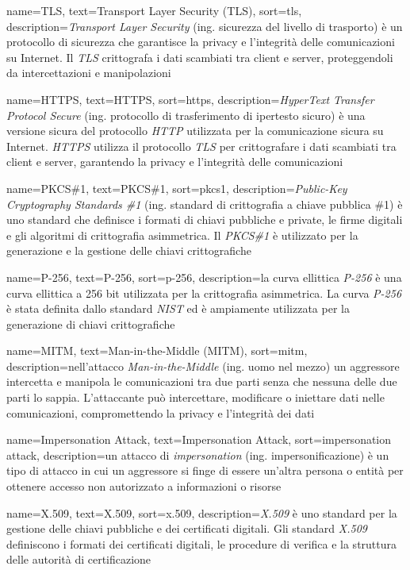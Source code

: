  {
    name=TLS,
    text=Transport Layer Security (TLS),
    sort=tls,
    description={\emph{Transport Layer Security} (ing. sicurezza del livello di trasporto) è un protocollo di sicurezza che garantisce la privacy e l'integrità delle comunicazioni su Internet. Il \emph{TLS} crittografa i dati scambiati tra client e server, proteggendoli da intercettazioni e manipolazioni}
}

 {
    name=HTTPS,
    text=HTTPS,
    sort=https,
    description={\emph{HyperText Transfer Protocol Secure} (ing. protocollo di trasferimento di ipertesto sicuro) è una versione sicura del protocollo \emph{HTTP} utilizzata per la comunicazione sicura su Internet. \emph{HTTPS} utilizza il protocollo \emph{TLS} per crittografare i dati scambiati tra client e server, garantendo la privacy e l'integrità delle comunicazioni}
}

 {
    name=PKCS\#1,
    text=PKCS\#1,
    sort=pkcs1,
    description={\emph{Public-Key Cryptography Standards \#1} (ing. standard di crittografia a chiave pubblica \#1) è uno standard che definisce i formati di chiavi pubbliche e private, le firme digitali e gli algoritmi di crittografia asimmetrica. Il \emph{PKCS\#1} è utilizzato per la generazione e la gestione delle chiavi crittografiche}
}

 {
    name=P-256,
    text=P-256,
    sort=p-256,
    description={la curva ellittica \emph{P-256} è una curva ellittica a 256 bit utilizzata per la crittografia asimmetrica. La curva \emph{P-256} è stata definita dallo standard \emph{NIST} ed è ampiamente utilizzata per la generazione di chiavi crittografiche}
}

 {
    name=MITM,
    text=Man-in-the-Middle (MITM),
    sort=mitm,
    description={nell'attacco \emph{Man-in-the-Middle} (ing. uomo nel mezzo) un aggressore intercetta e manipola le comunicazioni tra due parti senza che nessuna delle due parti lo sappia. L'attaccante può intercettare, modificare o iniettare dati nelle comunicazioni, compromettendo la privacy e l'integrità dei dati}
}

 {
    name=Impersonation Attack,
    text=Impersonation Attack,
    sort=impersonation attack,
    description={un attacco di \emph{impersonation} (ing. impersonificazione) è un tipo di attacco in cui un aggressore si finge di essere un'altra persona o entità per ottenere accesso non autorizzato a informazioni o risorse}
}

 {
    name=X.509,
    text=X.509,
    sort=x.509,
    description={\emph{X.509} è uno standard per la gestione delle chiavi pubbliche e dei certificati digitali. Gli standard \emph{X.509} definiscono i formati dei certificati digitali, le procedure di verifica e la struttura delle autorità di certificazione}
}